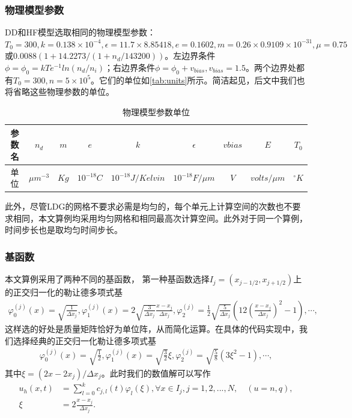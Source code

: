 \subsubsection{物理模型参数}
DD和HF模型选取相同的物理模型参数：$T_0 = 300, k = 0.138 \times 10^{-4}, \epsilon = 11.7\times 8.85418, e = 0.1602, m = 0.26\times0.9109\times 10^{-31}, \mu = 0.75 $或$0.0088(1+14.2273/(1+n_d/143200))$。左边界条件$\phi=\phi_0=kTe^{-1}ln(n_d/n_i)$；右边界条件$\phi = \phi_0+v_{bias}, v_{bias}=1.5$。两个边界处都有$T_0 = 300, n = 5\times 10^5$。它们的单位如\autoref{tab:units}所示\cite{cercignani2000deviceb}。简洁起见，后文中我们也将省略这些物理参数的单位。
\begin{table}[htbp]
    \centering
    \begin{tabular}{ccccccccc}
        \hline
        参数名 & $n_d$        & $m$  & $e$         & $k$                & $\epsilon$        & $vbias$ & $E$           & $T_0$      \\
        \hline
        单位   & $\mu m^{-3}$ & $Kg$ & $10^{-18}C$ & $10^{-18}J/Kelvin$ & $10^{-18}F/\mu m$ & $V$     & $volts/\mu m$ & $^\circ K$ \\
        \hline
    \end{tabular}
    \caption{物理模型参数单位}
    \label{tab:units}
\end{table}

此外，尽管LDG的网格不要求必需是均匀的，每个单元上计算空间的次数也不要求相同，本文算例均采用均匀网格和相同最高次计算空间。此外对于同一个算例，时间步长也是取均匀时间步长。
\subsubsection{基函数}
本文算例采用了两种不同的基函数，
第一种基函数选择$I_j = (x_{j-1/2}, x_{j+1/2})$上的正交归一化的勒让德多项式基
\begin{align*}
    \varphi_0^{(j)}(x) = \sqrt{\frac{1}{\Delta x_j}}, \varphi_1^{(j)}(x) = 2\sqrt{\frac{3}{\Delta x_j}}\frac{x-x_j}{\Delta x_j}, \varphi_2^{(j)} =\frac{1}{2}\sqrt{\frac{5}{\Delta x_j}}(12(\frac{x-x_j}{\Delta x_j})^2 - 1 ), \cdots,
\end{align*}
这样选的好处是质量矩阵恰好为单位阵，从而简化运算。在具体的代码实现中，我们选择经典的正交归一化勒让德多项式基
\begin{align*}
    \varphi_0^{(j)}(x) = \sqrt{\frac{1}{2}}, \varphi_1^{(j)}(x) = \sqrt{\frac{3}{2}}\xi, \varphi_2^{(j)} =\sqrt{\frac{5}{8}}(3\xi^2- 1 ), \cdots,
\end{align*}
其中$\xi = (2x-2x_j)/\Delta x_j$。此时我们的数值解可以写作
\begin{align*}
    u_h(x,t) & = \sum_{l=0}^k c_{j,l}(t)\varphi_{l}(\xi), \forall x \in I_j , j= 1,2,...,N, \quad (u = n,q), \\
    \xi      & = 2\frac{x-x_j}{\Delta x_j}.
\end{align*}

